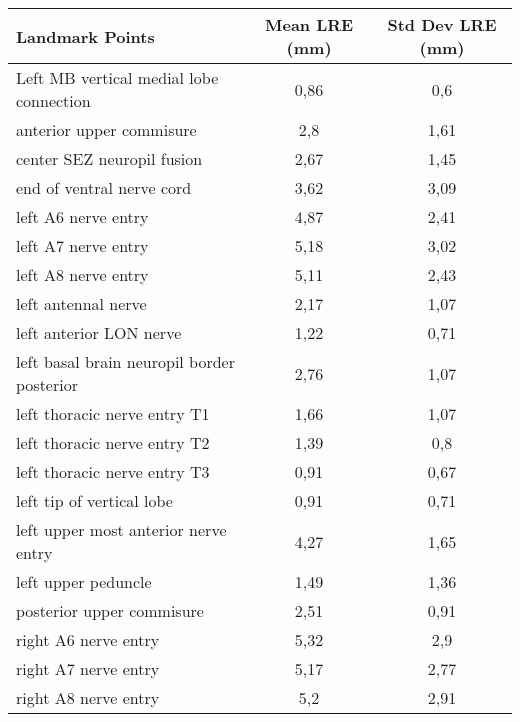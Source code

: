 \begin{tabular}{lcc}
\hline
 Landmark Points                             & Mean LRE (mm) & Std Dev LRE (mm) \\ \hline \hline
 Left MB vertical medial lobe connection     & 0,86          & 0,6              \\
 anterior upper commisure                    & 2,8           & 1,61             \\
 center SEZ neuropil fusion                  & 2,67          & 1,45             \\
 end of ventral nerve cord                   & 3,62          & 3,09             \\
 left A6 nerve entry                         & 4,87          & 2,41             \\
 left A7 nerve entry                         & 5,18          & 3,02             \\
 left A8 nerve entry                         & 5,11          & 2,43             \\
 left antennal nerve                         & 2,17          & 1,07             \\
 left anterior LON nerve                     & 1,22          & 0,71             \\
 left basal brain neuropil border posterior  & 2,76          & 1,07             \\
 left thoracic nerve entry T1                & 1,66          & 1,07             \\
 left thoracic nerve entry T2                & 1,39          & 0,8              \\
 left thoracic nerve entry T3                & 0,91          & 0,67             \\
 left tip of vertical lobe                   & 0,91          & 0,71             \\
 left upper most anterior nerve entry        & 4,27          & 1,65             \\
 left upper peduncle                         & 1,49          & 1,36             \\
 posterior upper commisure                   & 2,51          & 0,91             \\
 right A6 nerve entry                        & 5,32          & 2,9              \\
 right A7 nerve entry                        & 5,17          & 2,77             \\
 right A8 nerve entry                        & 5,2           & 2,91             \\

\end{tabular}
